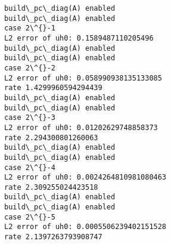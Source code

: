 \documentclass[11pt]{article}
\begin{document}
    \begin{Verbatim}[commandchars=\\\{\}]
build\_pc\_diag(A) enabled
build\_pc\_diag(A) enabled
case 2\^{}-1
L2 error of uh0: 0.1589487110205496
build\_pc\_diag(A) enabled
build\_pc\_diag(A) enabled
case 2\^{}-2
L2 error of uh0: 0.058990938135133085
rate 1.4299960594294439
build\_pc\_diag(A) enabled
build\_pc\_diag(A) enabled
case 2\^{}-3
L2 error of uh0: 0.01202629748858373
rate 2.294300801260063
build\_pc\_diag(A) enabled
build\_pc\_diag(A) enabled
case 2\^{}-4
L2 error of uh0: 0.0024264810981080463
rate 2.309255024423518
build\_pc\_diag(A) enabled
build\_pc\_diag(A) enabled
case 2\^{}-5
L2 error of uh0: 0.0005506239402151528
rate 2.1397263793908747
    \end{Verbatim}


    
    
    
\end{document}
